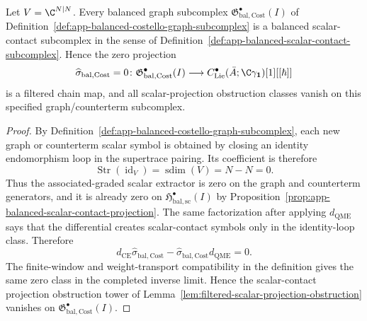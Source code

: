 \begin{prop}
\label{prop:app-balanced-costello-graph-preservation}
  Let \(V=\C^{N|N}\).  Every balanced graph subcomplex
  \(\mathfrak G^\bullet_{\mathrm{bal,Cost}}(I)\) of
  Definition~\ref{def:app-balanced-costello-graph-subcomplex} is a
  balanced scalar-contact subcomplex in the sense of
  Definition~\ref{def:app-balanced-scalar-contact-subcomplex}.  Hence the
  zero projection
  \[
    \widehat\sigma_{\mathrm{bal,Cost}}=0\colon
    \mathfrak G^\bullet_{\mathrm{bal,Cost}}(I)
      \longrightarrow
    C^\bullet_{\mathrm{Lie}}(\bar A;\C\gamma_{\mathbf 1})[1][[\hbar]]
  \]
  is a filtered chain map, and all scalar-projection obstruction classes
  vanish on this specified graph/counterterm subcomplex.
\end{prop}

\begin{proof}
  By Definition~\ref{def:app-balanced-costello-graph-subcomplex}, each
  new graph or counterterm scalar symbol is obtained by closing an
  identity endomorphism loop in the supertrace pairing.  Its coefficient
  is therefore
  \[
    \operatorname{Str}(\operatorname{id}_V)
      =
    \operatorname{sdim}(V)=N-N=0.
  \]
  Thus the associated-graded scalar extractor is zero on the graph and
  counterterm generators, and it is already zero on
  \(\mathfrak H^\bullet_{\mathrm{bal,sc}}(I)\) by
  Proposition~\ref{prop:app-balanced-scalar-contact-projection}.  The
  same factorization after applying \(d_{\mathrm{QME}}\) says that the
  differential creates scalar-contact symbols only in the identity-loop
  class.  Therefore
  \[
    d_{\mathrm{CE}}\widehat\sigma_{\mathrm{bal,Cost}}
      -
    \widehat\sigma_{\mathrm{bal,Cost}}d_{\mathrm{QME}}=0.
  \]
  The finite-window and weight-transport compatibility in the definition
  gives the same zero class in the completed inverse limit.  Hence the
  scalar-contact projection obstruction tower of
  Lemma~\ref{lem:filtered-scalar-projection-obstruction} vanishes on
  \(\mathfrak G^\bullet_{\mathrm{bal,Cost}}(I)\).
\end{proof}

